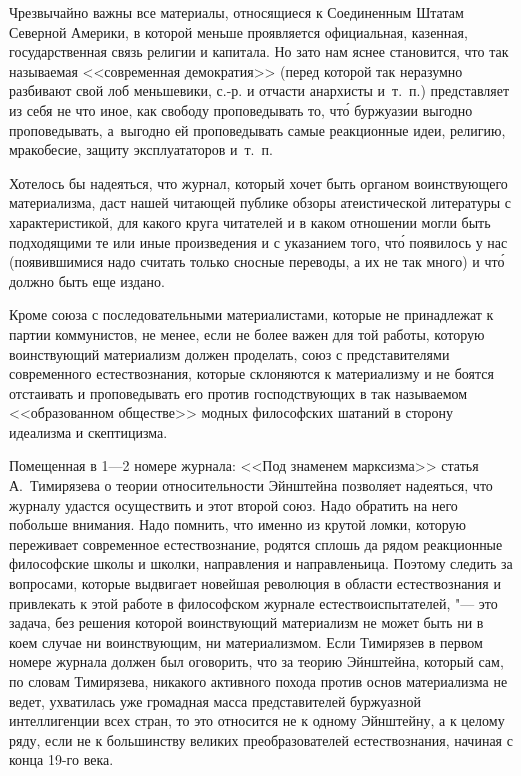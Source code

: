 Чрезвычайно важны все материалы, относящиеся к Соединенным Штатам Северной
Америки, в которой меньше проявляется официальная, казенная,
государственная связь религии и капитала. Но зато нам яснее становится, что
так называемая <<современная демократия>> (перед которой так неразумно
разбивают свой лоб меньшевики, с.-р. и отчасти анархисты и~т.~п.)
представляет из себя не что иное, как свободу проповедывать то, чт\'{о}
буржуазии выгодно проповедывать, а~выгодно ей проповедывать самые
реакционные идеи, религию, мракобесие, защиту эксплуататоров и~т.~п.

Хотелось бы надеяться, что журнал, который хочет быть органом воинствующего
материализма, даст нашей читающей публике обзоры атеистической литературы с
характеристикой, для какого круга читателей и в каком отношении могли быть
подходящими те или иные произведения и с указанием того, чт\'{о} появилось у
нас (появившимися надо считать только сносные переводы, а их не так много)
и чт\'{о} должно быть еще издано.

Кроме союза с последовательными материалистами, которые не принадлежат к
партии коммунистов, не менее, если не более важен для той работы, которую
воинствующий материализм должен проделать, союз с представителями
современного естествознания, которые склоняются к материализму и не боятся
отстаивать и проповедывать его против господствующих в так называемом
<<образованном обществе>> модных философских шатаний в сторону идеализма и
скептицизма.

Помещенная в 1---2 номере журнала: <<Под знаменем марксизма>> статья
А.~Тимирязева о теории относительности Эйнштейна
позволяет надеяться, что журналу удастся осуществить и этот второй союз.
Надо обратить на него побольше внимания. Надо помнить, что именно из крутой
ломки, которую переживает современное естествознание, родятся сплошь да
рядом реакционные философские школы и школки, направления и направленьица.
Поэтому следить за вопросами, которые выдвигает новейшая революция в
области естествознания и привлекать к этой работе в философском журнале
естествоиспытателей, "--- это задача, без решения которой воинствующий
материализм не может быть ни в коем случае ни воинствующим, ни
материализмом. Если Тимирязев в первом номере журнала должен был оговорить,
что за теорию Эйнштейна, который сам, по словам Тимирязева, никакого
активного похода против основ материализма не ведет, ухватилась уже
громадная масса представителей буржуазной интеллигенции всех стран, то это
относится не к одному Эйнштейну, а к целому ряду, если не к большинству
великих преобразователей естествознания, начиная с конца 19-го века.

